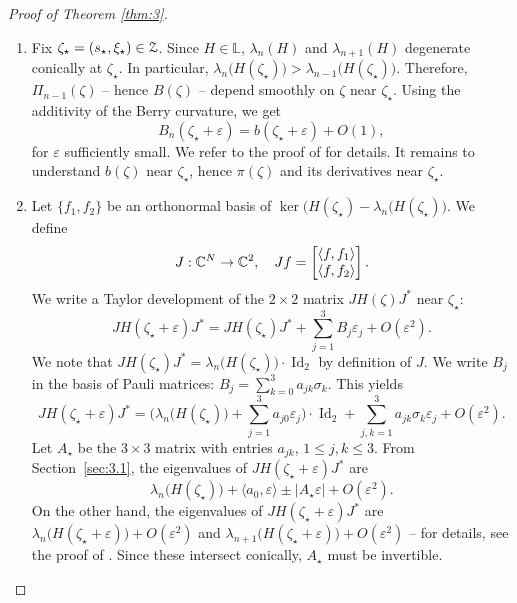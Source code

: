 \documentclass[11pt]{article}
\numberwithin{equation}{section}
\let\pazocal\EuScript
\theoremstyle{definition}
\DeclareMathOperator{\Id}{Id}
\newcommand{\ZZZ}{{\pazocal{Z}}}
\newcommand{\C}{\mathbb{C}}
\newcommand{\Ll}{\mathbb{L}}
\let\epsi\varepsilon
\newcommand{\matrice}[1]{\arraycolsep3.5pt\begin{bmatrix}#1\end{bmatrix}}
\newcommand{\lr}[1]{\langle #1 \rangle}
\begin{document}
\begin{proof}[Proof of Theorem \ref{thm:3}]
\begin{enumerate}
\item
Fix $\zeta_\star = (s_\star,\xi_\star) \in \ZZZ$. Since $H \in \Ll$, $\lambda_n(H)$ and $\lambda_{n+1}(H)$ degenerate conically at $\zeta_\star$. In particular, $\lambda_n\bigl(H(\zeta_\star)\bigr) > \lambda_{n-1}\bigl(H(\zeta_\star)\bigr)$. Therefore, $\Pi_{n-1}(\zeta)$ -- hence $B(\zeta)$ -- depend smoothly on $\zeta$ near $\zeta_\star$.
Using the additivity of the Berry curvature, we get
\begin{equation}\label{eq:0l}
B_n(\zeta_\star+\epsi) = b(\zeta_\star+\epsi) + O(1),
\end{equation}
for $\epsi$ sufficiently small. We refer to the proof of \cite[(2.21)]{D19b} for details. It remains to understand $b(\zeta)$ near $\zeta_\star$, hence $\pi(\zeta)$ and its derivatives near $\zeta_\star$.

\item
Let $\{f_1,f_2\}$ be an orthonormal basis of $\ker\bigl( H(\zeta_\star)-\lambda_n\bigl( H(\zeta_\star) \bigr)$. We define
\begin{equation*}
J : \C^N \to \C^2, \quad Jf = \matrice{\lr{f,f_1} \\ \lr{f,f_2}}.
\end{equation*}
We write a Taylor development of the $2 \times 2$ matrix $J H(\zeta) J^*$ near $\zeta_\star$:
\[
J H(\zeta_\star+\epsi) J^* = J H(\zeta_\star) J^* + \sum_{j=1}^3 B_j \epsi_j + O(\epsi^2).
\]
We note that $J H(\zeta_\star) J^* = \lambda_n\bigl( H(\zeta_\star) \bigr) \cdot \Id_2$ by definition of $J$.
We write $B_j$ in the basis of Pauli matrices: $B_j = \sum_{k=0}^3 a_{jk} \sigma_k$. This yields
\begin{equation}\label{eq:0i}
J H(\zeta_\star+\epsi) J^* = \biggl( \lambda_n\bigl( H(\zeta_\star) \bigr) + \sum_{j=1}^3 a_{j0} \epsi_j \biggr) \cdot \Id_2 + \sum_{j, k=1}^3 a_{jk} \sigma_k \epsi_j + O(\epsi^2).
\end{equation}
Let $A_\star$ be the $3 \times 3$ matrix with entries $a_{jk}$, $1 \leq j,k \leq 3$. From Section~\ref{sec:3.1}, the eigenvalues of $J H(\zeta_\star+\epsi) J^*$ are
\begin{equation}\label{eq:0r}
\lambda_n\bigl( H(\zeta_\star) \bigr) + \lr{a_0,\epsi} \pm |A_\star\epsi| + O(\epsi^2).
\end{equation}
On the other hand, the eigenvalues of $J H(\zeta_\star+\epsi) J^*$ are $\lambda_n\bigl(H(\zeta_\star+\epsi)\bigr) + O(\epsi^2)$ and $\lambda_{n+1}\bigl( H(\zeta_\star+\epsi)\bigr) + O(\epsi^2)$ -- for details, see the proof of \cite[(2.19)]{D19b}. Since these intersect conically, $A_\star$ must be invertible.


\end{enumerate}
\end{proof}
\end{document}
